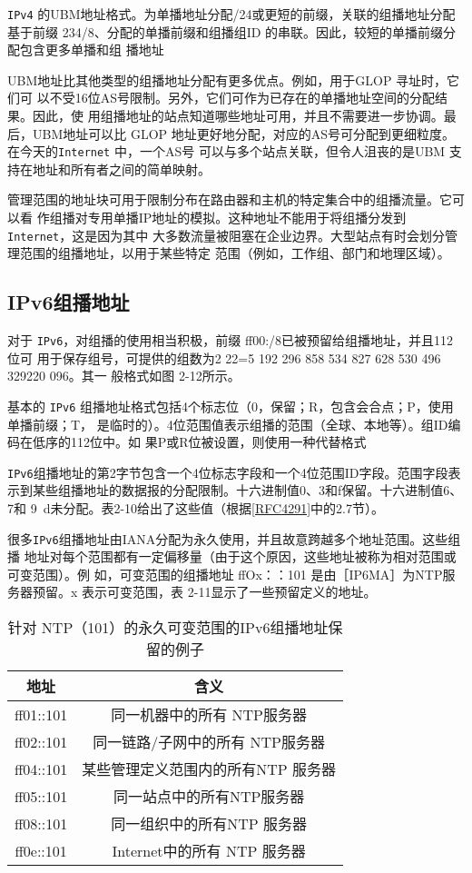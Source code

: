 \verb|IPv4| 的UBM地址格式。为单播地址分配/24或更短的前缀，关联的组播地址分配基于前缀
234/8、分配的单播前缀和组播组ID 的串联。因此，较短的单播前缀分配包含更多单播和组
播地址

UBM地址比其他类型的组播地址分配有更多优点。例如，用于GLOP 寻址时，它们可
以不受16位AS号限制。另外，它们可作为已存在的单播地址空间的分配结果。因此，使
用组播地址的站点知道哪些地址可用，并且不需要进一步协调。最后，UBM地址可以比
GLOP 地址更好地分配，对应的AS号可分配到更细粒度。在今天的\verb|Internet| 中，一个AS号
可以与多个站点关联，但令人沮丧的是UBM 支持在地址和所有者之间的简单映射。

管理范围的地址块可用于限制分布在路由器和主机的特定集合中的组播流量。它可以看
作组播对专用单播IP地址的模拟。这种地址不能用于将组播分发到 \verb|Internet|，这是因为其中
大多数流量被阻塞在企业边界。大型站点有时会划分管理范围的组播地址，以用于某些特定
范围（例如，工作组、部门和地理区域）。

\subsection{IPv6组播地址}

对于 \verb|IPv6|，对组播的使用相当积极，前缀 ff00:/8已被预留给组播地址，并且112位可
用于保存组号，可提供的组数为2 22=5 192 296 858 534 827 628 530 496 329220 096。其一
般格式如图 2-12所示。

基本的 \verb|IPv6| 组播地址格式包括4个标志位（0，保留；R，包含会合点；P，使用单播前缀；T，
是临时的）。4位范围值表示组播的范围（全球、本地等）。组ID编码在低序的112位中。如
果P或R位被设置，则使用一种代替格式

\verb|IPv6|组播地址的第2字节包含一个4位标志字段和一个4位范围ID字段。范围字段表
示到某些组播地址的数据报的分配限制。十六进制值0、3和f保留。十六进制值6、7和
9~d未分配。表2-10给出了这些值（根据\href{https://www.rfc-editor.org/rfc/rfc4291}{[RFC4291]}中的2.7节）。

很多\verb|IPv6|组播地址由IANA分配为永久使用，并且故意跨越多个地址范围。这些组播
地址对每个范围都有一定偏移量（由于这个原因，这些地址被称为相对范围或可变范围）。例
如，可变范围的组播地址 ffOx：：101 是由［IP6MA］为NTP服务器预留。x 表示可变范围，表
2-11显示了一些预留定义的地址。

\begin{table}[H]
    \centering
    \caption{针对 NTP（101）的永久可变范围的IPv6组播地址保留的例子}
    \begin{tabular}{|c|c|}
    \hline
        地址       & 含义                             \\ \hline
        ff01::101 & 同一机器中的所有 NTP服务器 \\ \hline
        ff02::101 & 同一链路/子网中的所有 NTP服务器 \\ \hline
        ff04::101 & 某些管理定义范围内的所有NTP 服务器 \\ \hline
        ff05::101 & 同一站点中的所有NTP服务器 \\ \hline
        ff08::101 & 同一组织中的所有NTP 服务器 \\ \hline
        ff0e::101 & Internet中的所有 NTP 服务器 \\ \hline
    \end{tabular}
\end{table}

